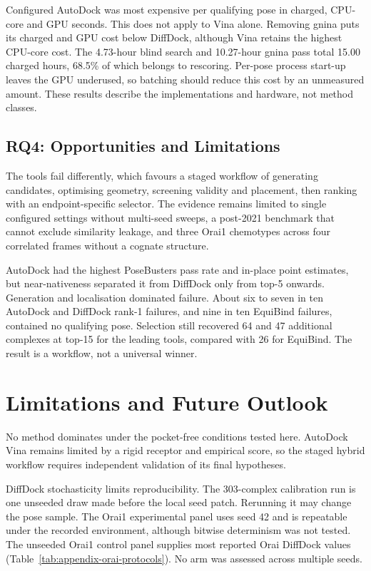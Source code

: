 Configured AutoDock was most expensive per qualifying pose in charged, CPU-core and GPU seconds. This does not apply to Vina alone. Removing gnina puts its charged and GPU cost below DiffDock, although Vina retains the highest CPU-core cost. The 4.73-hour blind search and 10.27-hour gnina pass total 15.00 charged hours, 68.5\% of which belongs to rescoring. Per-pose process start-up leaves the GPU underused, so batching should reduce this cost by an unmeasured amount. These results describe the implementations and hardware, not method classes.

\hypertarget{rq4-opportunities-and-limitations}{%
\section{RQ4: Opportunities and Limitations}\label{rq4-opportunities-and-limitations}}

The tools fail differently, which favours a staged workflow of generating candidates, optimising geometry, screening validity and placement, then ranking with an endpoint-specific selector. The evidence remains limited to single configured settings without multi-seed sweeps, a post-2021 benchmark that cannot exclude similarity leakage, and three Orai1 chemotypes across four correlated frames without a cognate structure.

AutoDock had the highest PoseBusters pass rate and in-place point estimates, but near-nativeness separated it from DiffDock only from top-5 onwards. Generation and localisation dominated failure. About six to seven in ten AutoDock and DiffDock rank-1 failures, and nine in ten EquiBind failures, contained no qualifying pose. Selection still recovered 64 and 47 additional complexes at top-15 for the leading tools, compared with 26 for EquiBind. The result is a workflow, not a universal winner.

\hypertarget{limitations-and-future-outlook}{%
\chapter{Limitations and Future Outlook}\label{limitations-and-future-outlook}}

No method dominates under the pocket-free conditions tested here. AutoDock Vina remains limited by a rigid receptor and empirical score, so the staged hybrid workflow requires independent validation of its final hypotheses.

DiffDock stochasticity limits reproducibility. The 303-complex calibration run is one unseeded draw made before the local seed patch. Rerunning it may change the pose sample. The Orai1 experimental panel uses seed 42 and is repeatable under the recorded environment, although bitwise determinism was not tested. The unseeded Orai1 control panel supplies most reported Orai DiffDock values (Table~\ref{tab:appendix-orai-protocols}). No arm was assessed across multiple seeds.

